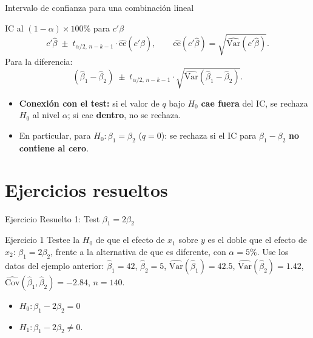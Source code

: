 \documentclass{beamer}
\begin{document}
\begin{frame}{Intervalo de confianza para una combinación lineal}
\begin{block}{IC al $(1-\alpha)\times 100\%$ para $c'\beta$}
\[
c'\hat{\beta} \;\pm\; t_{\alpha/2,\,n-k-1}\cdot \widehat{\text{ee}}(c'\hat{\beta}),
\qquad \widehat{\text{ee}}(c'\hat{\beta})=\sqrt{\hat{\text{Var}}(c'\hat{\beta})}.
\]
Para la diferencia:
\[
(\hat{\beta}_1-\hat{\beta}_2)\;\pm\; t_{\alpha/2,\,n-k-1}\cdot\sqrt{\hat{\text{Var}}(\hat{\beta}_1-\hat{\beta}_2)}.
\]
\end{block}
\pause
\begin{itemize}
    \item \textbf{Conexión con el test:} si el valor de $q$ bajo $H_0$ \textbf{cae fuera} del IC, se rechaza $H_0$ al nivel $\alpha$; si cae \textbf{dentro}, no se rechaza.
    \item En particular, para $H_0:\beta_1=\beta_2$ ($q=0$): se rechaza si el IC para $\beta_1-\beta_2$ \textbf{no contiene al cero}.
\end{itemize}
\end{frame}

\section{Ejercicios resueltos}

\begin{frame}{Ejercicio Resuelto 1: Test $\beta_1 = 2\beta_2$}
\begin{block}{Ejercicio 1}
Testee la $H_0$ de que el efecto de $x_1$ sobre $y$ es el doble que el efecto de $x_2$: $\beta_1=2\beta_2$, frente a la alternativa de que es diferente, con $\alpha=5\%$. Use los datos del ejemplo anterior: $\hat{\beta}_1=42$, $\hat{\beta}_2=5$, $\hat{\text{Var}}(\hat{\beta}_1)=42{.}5$, $\hat{\text{Var}}(\hat{\beta}_2)=1{.}42$, $\hat{\text{Cov}}(\hat{\beta}_1,\hat{\beta}_2)=-2{.}84$, $n=140$.
    \begin{itemize}
          \item $H_0: \beta_1 - 2\beta_2 = 0$
          \item $H_1: \beta_1 - 2\beta_2 \neq 0$.
  \end{itemize}
\end{block}
\end{frame}
\end{document}
